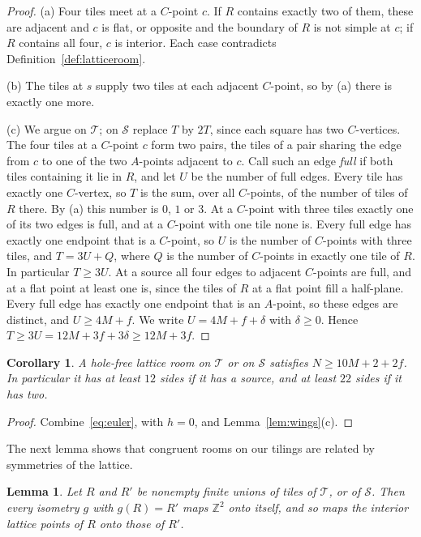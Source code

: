 \documentclass[11pt,a4paper]{article}
\theoremstyle{plain}
\newtheorem{lemma}[theorem]{Lemma}
\newtheorem{corollary}[theorem]{Corollary}
\theoremstyle{definition}
\theoremstyle{remark}
\newcommand{\Z}{\mathbb{Z}}
\newcommand{\T}{\mathcal{T}}
\newcommand{\Sq}{\mathcal{S}}
\numberwithin{equation}{section}
\begin{document}
\begin{proof}
(a) Four tiles meet at a $C$-point $c$. If $R$ contains exactly two of them, these are adjacent and $c$ is flat, or opposite and the boundary of $R$ is not simple at $c$; if $R$ contains all four, $c$ is interior. Each case contradicts Definition~\ref{def:latticeroom}.

(b) The tiles at $s$ supply two tiles at each adjacent $C$-point, so by (a) there is exactly one more.

(c) We argue on $\T$; on $\Sq$ replace $T$ by $2T$, since each square has two $C$-vertices. The four tiles at a $C$-point $c$ form two pairs, the tiles of a pair sharing the edge from $c$ to one of the two $A$-points adjacent to $c$. Call such an edge \emph{full} if both tiles containing it lie in $R$, and let $U$ be the number of full edges. Every tile has exactly one $C$-vertex, so $T$ is the sum, over all $C$-points, of the number of tiles of $R$ there. By (a) this number is $0$, $1$ or $3$. At a $C$-point with three tiles exactly one of its two edges is full, and at a $C$-point with one tile none is. Every full edge has exactly one endpoint that is a $C$-point, so $U$ is the number of $C$-points with three tiles, and $T=3U+Q$, where $Q$ is the number of $C$-points in exactly one tile of $R$. In particular $T\ge3U$. At a source all four edges to adjacent $C$-points are full, and at a flat point at least one is, since the tiles of $R$ at a flat point fill a half-plane. Every full edge has exactly one endpoint that is an $A$-point, so these edges are distinct, and $U\ge4M+f$. We write $U=4M+f+\delta$ with $\delta\ge0$. Hence $T\ge3U=12M+3f+3\delta\ge12M+3f$.
\end{proof}

\begin{corollary}\label{cor:bound}
A hole-free lattice room on $\T$ or on $\Sq$ satisfies $N\ge10M+2+2f$. In particular it has at least $12$ sides if it has a source, and at least $22$ sides if it has two.
\end{corollary}

\begin{proof}
Combine~\eqref{eq:euler}, with $h=0$, and Lemma~\ref{lem:wings}(c).
\end{proof}

The next lemma shows that congruent rooms on our tilings are related by symmetries of the lattice.

\begin{lemma}\label{lem:congruence}
Let $R$ and $R'$ be nonempty finite unions of tiles of $\T$, or of $\Sq$. Then every isometry $g$ with $g(R)=R'$ maps $\Z^2$ onto itself, and so maps the interior lattice points of $R$ onto those of $R'$.
\end{lemma}
\end{document}
